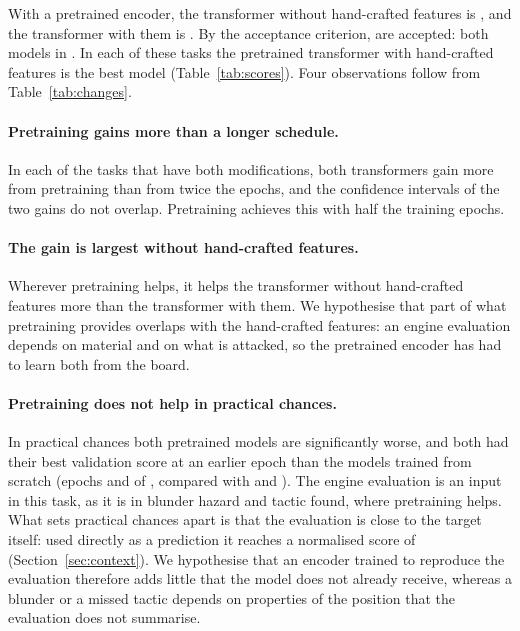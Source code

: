 \documentclass[11pt]{article}
\begin{document}
With a pretrained encoder, the transformer without hand-crafted features is
, and the transformer with
them is . By the
acceptance criterion,  are accepted: both
models in . In each of these tasks
the pretrained transformer with hand-crafted features is the best model
(Table~\ref{tab:scores}). Four observations follow from
Table~\ref{tab:changes}.

\paragraph{Pretraining gains more than a longer schedule.}
In each of the  tasks that
have both modifications, both transformers gain more from pretraining than
from twice the epochs, and the confidence intervals of the two gains do not
overlap. Pretraining achieves this with half the training epochs.

\paragraph{The gain is largest without hand-crafted features.}
Wherever pretraining helps, it helps the transformer without hand-crafted
features more than the transformer with them. We hypothesise that part of
what pretraining provides overlaps with the hand-crafted features: an engine
evaluation depends on material and on what is attacked, so the pretrained
encoder has had to learn both from the board.

\paragraph{Pretraining does not help in practical chances.}
In practical chances both pretrained models are significantly worse, and
both had their best validation score at an earlier epoch than the models
trained from scratch (epochs
 and
 of
, compared with
 and
). The engine
evaluation is an input in this task, as it is in blunder hazard and tactic
found, where pretraining helps. What sets practical chances apart is that the
evaluation is close to the target itself: used directly as a prediction it
reaches a normalised score of
(Section~\ref{sec:context}). We hypothesise that an encoder trained to
reproduce the evaluation therefore adds little that the model does not
already receive, whereas a blunder or a missed tactic depends on properties
of the position that the evaluation does not summarise.
\end{document}
